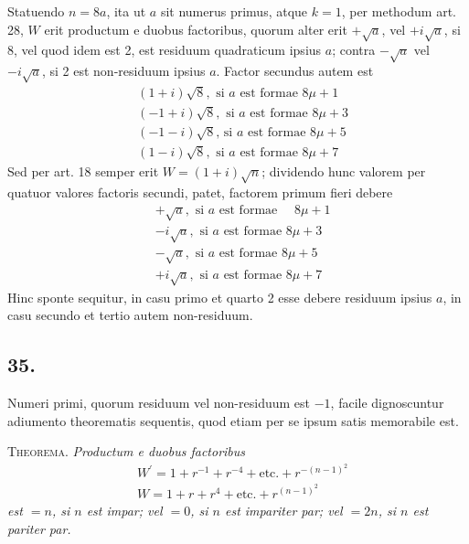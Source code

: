 \documentclass[twoside,12pt]{memoir}
\begin{document}
Statuendo \(n=8 a\), ita ut \(a\) sit numerus primus, atque \(k=1\), per methodum art. 28, \(W\) erit productum e duobus factoribus, quorum alter erit \(+\surd a\), vel \(+i \surd a\), si 8, vel quod idem est 2, est residuum quadraticum ipsius \(a\); contra \(-\surd a\) vel \(-i \surd a\), si 2 est non-residuum ipsius \(a\). Factor secundus autem est
\[\begin{aligned}
& (1+i) \surd 8, \text{ si } a \text{ est formae } 8 \mu+1 \\
& (-1+i) \surd 8, \text{ si } a \text{ est formae } 8 \mu+3 \\
& (-1-i) \surd 8 \text{, si } a \text{ est formae } 8 \mu+5 \\
& (1-i) \surd 8, \text{ si } a \text{ est formae } 8 \mu+7
\end{aligned}\]
Sed per art. 18 semper erit \(W=(1+i) \surd n\); dividendo hunc valorem per quatuor valores factoris secundi, patet, factorem primum fieri debere
\[\begin{aligned}
& +\surd a, \text{ si } a \text{ est formae } \quad 8 \mu+1 \\
& -i \surd a, \text{ si } a \text{ est formae } 8 \mu+3 \\
& -\surd a, \text{ si } a \text{ est formae } 8 \mu+5 \\
& +i \surd a, \text{ si } a \text{ est formae } 8 \mu+7
\end{aligned}\]
Hinc sponte sequitur, in casu primo et quarto 2 esse debere residuum ipsius \(a\), in casu secundo et tertio autem non-residuum.\pagebreak%

\subsection*{35.}
 
Numeri primi, quorum residuum vel non-residuum est \(-1\), facile dignoscuntur adiumento theorematis sequentis, quod etiam per se ipsum satis memorabile est.
 
\textsc{Theorema.} \textit{Productum e duobus factoribus}
\[\begin{aligned}
& W^{\prime}=1+r^{-1}+r^{-4}+\text{etc.}+r^{-(n-1)^{2}} \\
& W=1+r+r^{4}+\text{etc.}+r^{(n-1)^{2}}
\end{aligned}\]
\textit{est \(=n\), si \(n\) est impar; vel \(=0\), si \(n\) est impariter par; vel \(=2 n\), si \(n\) est pariter par.}
 
\end{document}
